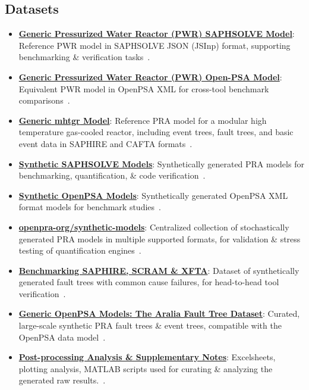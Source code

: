 \subsection{Datasets}
\begin{itemize}
    \item \textbf{\href{https://doi.org/10.5281/zenodo.13996959}{Generic Pressurized Water Reactor (PWR) SAPHSOLVE Model}}: Reference PWR model in SAPHSOLVE JSON (JSInp) format, supporting benchmarking \& verification tasks~\cite{aras_generic_2024}.
   
    \item \textbf{\href{https://doi.org/10.5281/zenodo.14070453}{Generic Pressurized Water Reactor (PWR) Open-PSA Model}}: Equivalent PWR model in OpenPSA XML for cross-tool benchmark comparisons~\cite{aras_generic_2024-1}.

    \item \textbf{\href{https://zenodo.org/doi/10.5281/zenodo.15397904}{Generic \acrfull{mhtgr} Model}}: Reference PRA model for a modular high temperature gas-cooled reactor, including event trees, fault trees, and basic event data in SAPHIRE and CAFTA formats~\cite{hamza_openpra-orggeneric-mhtgr-model_2025}.

    \item \textbf{\href{https://doi.org/10.5281/zenodo.13996735}{Synthetic SAPHSOLVE Models}}: Synthetically generated PRA models for benchmarking, quantification, \& code verification~\cite{aras_synthetic_2024}.
    
    \item \textbf{\href{https://doi.org/10.5281/zenodo.13996370}{Synthetic OpenPSA Models}}: Synthetically generated OpenPSA XML format models for benchmark studies~\cite{aras_synthetic_2024-1}.
    
    \item \textbf{\href{https://doi.org/10.5281/zenodo.15320670}{openpra-org/synthetic-models}}: Centralized collection of stochastically generated PRA models in multiple supported formats, for validation \& stress testing of quantification engines~\cite{aras_synthetic_2025}.
    
    \item \textbf{\href{https://doi.org/10.5281/zenodo.7706615}{Benchmarking SAPHIRE, SCRAM \& XFTA}}: Dataset of synthetically generated fault trees with common cause failures, for head-to-head tool verification~\cite{earthperson_dataset_2023}.
    
    \item \textbf{\href{https://doi.org/10.5281/zenodo.15293416}{Generic OpenPSA Models: The Aralia Fault Tree Dataset}}: Curated, large-scale synthetic PRA fault trees \& event trees, compatible with the OpenPSA data model~\cite{earthperson_generic_2021}.

    \item \textbf{\href{https://zenodo.org/doi/10.5281/zenodo.15320401}{Post-processing Analysis \& Supplementary Notes}}: Excelsheets, plotting analysis, MATLAB scripts used for curating \& analyzing the generated raw results.~\cite{earthperson_benchmarks_2025}.
\end{itemize}
